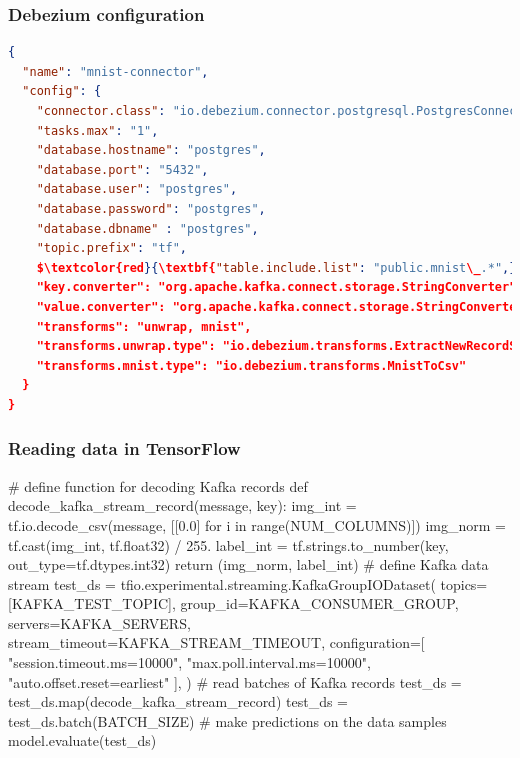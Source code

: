 \documentclass[10pt,utf8]{beamer}
\begin{document}
\begin{frame}[fragile]
    \frametitle{Debezium configuration}
    \footnotesize
    \begin{lstlisting}[language=json, mathescape=true]
{
  "name": "mnist-connector",
  "config": {
    "connector.class": "io.debezium.connector.postgresql.PostgresConnector",
    "tasks.max": "1",
    "database.hostname": "postgres",
    "database.port": "5432",
    "database.user": "postgres",
    "database.password": "postgres",
    "database.dbname" : "postgres",
    "topic.prefix": "tf",
    $\textcolor{red}{\textbf{"table.include.list": "public.mnist\_.*",}}$
    "key.converter": "org.apache.kafka.connect.storage.StringConverter",
    "value.converter": "org.apache.kafka.connect.storage.StringConverter",
    "transforms": "unwrap, mnist",
    "transforms.unwrap.type": "io.debezium.transforms.ExtractNewRecordState",
    "transforms.mnist.type": "io.debezium.transforms.MnistToCsv"
  }
} 
     \end{lstlisting}
\end{frame}

\begin{frame}[fragile]
    \frametitle{Reading data in TensorFlow}
    \vspace{-0.2cm}
    \footnotesize
    \begin{python}
# define function for decoding Kafka records
def decode_kafka_stream_record(message, key):
    img_int = tf.io.decode_csv(message, [[0.0] for i in range(NUM_COLUMNS)])
    img_norm = tf.cast(img_int, tf.float32) / 255.
    label_int = tf.strings.to_number(key, out_type=tf.dtypes.int32)
    return (img_norm, label_int)
# define Kafka data stream
test_ds = tfio.experimental.streaming.KafkaGroupIODataset(
    topics=[KAFKA_TEST_TOPIC],
    group_id=KAFKA_CONSUMER_GROUP,
    servers=KAFKA_SERVERS,
    stream_timeout=KAFKA_STREAM_TIMEOUT,
    configuration=[
        "session.timeout.ms=10000",
        "max.poll.interval.ms=10000",
        "auto.offset.reset=earliest"
    ],
)
# read batches of Kafka records
test_ds = test_ds.map(decode_kafka_stream_record)
test_ds = test_ds.batch(BATCH_SIZE)
# make predictions on the data samples
model.evaluate(test_ds)
    \end{python}
\end{frame}
\end{document}
